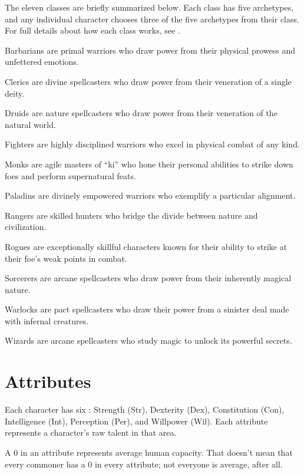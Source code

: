     The eleven classes are briefly summarized below.
    Each class has five archetypes, and any individual character chooses three of the five archetypes from their class.
    For full details about how each class works, see .
    \begin{raggeditemize}
        \item Barbarians are primal warriors who draw power from their physical prowess and unfettered emotions.
        \item Clerics are divine spellcasters who draw power from their veneration of a single deity.
        \item Druids are nature spellcasters who draw power from their veneration of the natural world.
        \item Fighters are highly disciplined warriors who excel in physical combat of any kind.
        \item Monks are agile masters of ``ki'' who hone their personal abilities to strike down foes and perform supernatural feats.
        \item Paladins are divinely empowered warriors who exemplify a particular alignment.
        \item Rangers are skilled hunters who bridge the divide between nature and civilization.
        \item Rogues are exceptionally skillful characters known for their ability to strike at their foe's weak points in combat.
        \item Sorcerers are arcane spellcasters who draw power from their inherently magical nature.
        \item Warlocks are pact spellcasters who draw their power from a sinister deal made with infernal creatures.
        \item Wizards are arcane spellcasters who study magic to unlock its powerful secrets.
    \end{raggeditemize}

\section{Attributes}\label{Attributes}

    Each character has six : Strength (Str), Dexterity (Dex), Constitution (Con), Intelligence (Int), Perception (Per), and Willpower (Wil).
    Each attribute represents a character's raw talent in that area.

    A 0 in an attribute represents average human capacity.
    That doesn't mean that every commoner has a 0 in every attribute; not everyone is average, after all.

